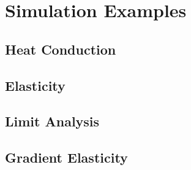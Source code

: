 \let\clearforchapter\par %
\chapter{Simulation Examples}

\section{Heat Conduction}

\section{Elasticity}

\section{Limit Analysis}

\section{Gradient Elasticity}

